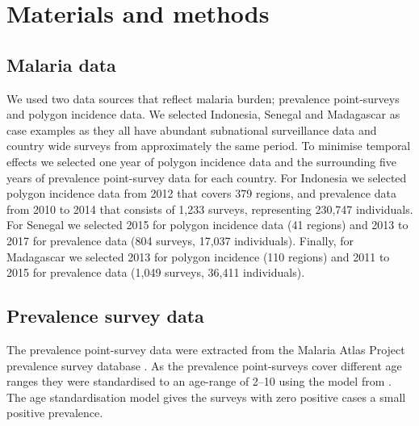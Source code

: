 \documentclass{statsoc}
\begin{document}




\section*{Materials and methods}


\subsection*{Malaria data}

We used two data sources that reflect malaria burden; prevalence point-surveys and polygon incidence data.
We selected Indonesia, Senegal and Madagascar as case examples as they all have abundant subnational surveillance data and country wide surveys from approximately the same period.
To minimise temporal effects we selected one year of polygon incidence data and the surrounding five years of prevalence point-survey data for each country.
For Indonesia we selected polygon incidence data from 2012 that covers 379 regions, and prevalence data from 2010 to 2014 that consists of 1,233 surveys, representing 230,747 individuals.
For Senegal we selected 2015 for polygon incidence data (41 regions) and 2013 to 2017 for prevalence data (804 surveys, 17,037 individuals).
Finally, for Madagascar we selected 2013 for polygon incidence (110 regions) and 2011 to 2015 for prevalence data (1,049 surveys, 36,411 individuals).


\subsection*{Prevalence survey data}

The prevalence point-survey data were extracted from the Malaria Atlas Project prevalence survey database \citep{bhatt2015effect, guerra2007assembling, pfeffer2018ma}.
As the prevalence point-surveys cover different age ranges they were standardised to an age-range of 2--10 using the model from \citep{smith2007standardizing}.
The age standardisation model gives the surveys with zero positive cases a small positive prevalence.
\end{document}
